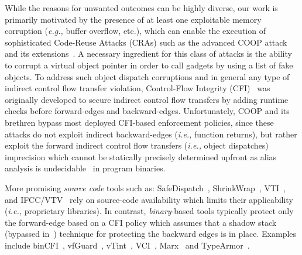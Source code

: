 While the reasons for unwanted outcomes can be highly diverse, our work is primarily motivated by the presence of at least one exploitable
memory corruption (\textit{e.g.,} buffer overflow, etc.), which can enable the execution of sophisticated Code-Reuse Attacks (CRAs) such as the advanced COOP attack~\cite{schuster:coop} and its 
extensions~\cite{crane:readactor++, subversive-c:lettner, ctf:coop, loop:oriented}. A necessary ingredient for this class of attacks is the ability
to corrupt a virtual object pointer in order to call gadgets by using a list of fake objects.
To address such object dispatch corruptions
and in general any type of indirect control flow transfer violation, Control-Flow Integrity (CFI)~\cite{abadi:cfi2, abadi:cfi} was originally developed to secure indirect control flow transfers by adding 
runtime checks before forward-edges and backward-edges. Unfortunately, COOP and its brethren bypass most deployed CFI-based enforcement policies, since 
these attacks do not exploit indirect backward-edges (\textit{i.e.,} function returns), but rather exploit the forward indirect control flow transfers (\textit{i.e.,} object dispatches)
imprecision which cannot be statically precisely determined upfront as alias analysis is undecidable~\cite{alias:undecidable} in program binaries.

More promising \textit{source code} tools such as: SafeDispatch~\cite{safedispatch:jang}, 
ShrinkWrap~\cite{haller:shrinkwrap}, VTI~\cite{bounov:interleaving}, and IFCC/VTV~\cite{vtv:tice}
rely on source-code availability which limits their applicability (\textit{i.e.,} proprietary libraries).
In contrast, \textit{binary}-based tools typically protect only the forward-edge based on a CFI 
policy which assumes that a shadow stack~\cite{volodymyr:cpi} (bypassed in~\cite{safestack:bypassing}) 
technique for protecting the backward edges is in place.
Examples include binCFI~\cite{ccfir:zhang, zhang:usenix}, vfGuard~\cite{vfuard:aravind}, 
vTint~\cite{vtint:zhang}, VCI~\cite{vci:asiaccs}, Marx~\cite{marx} and TypeArmor~\cite{veen:typearmor}. 


